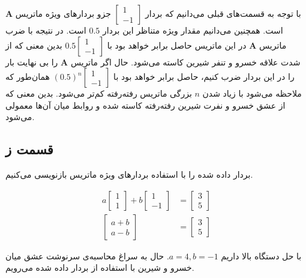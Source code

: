 \documentclass[14pt,a4]{article}
\begin{document}
با توجه به قسمت‌های قبلی می‌دانیم که بردار $\begin{bmatrix}
    1 \\
    -1
\end{bmatrix}$ جزو بردار‌های ویژه ماتریس $\textbf{A}$ است. همچنین می‌دانیم مقدار ویژه متناظر این بردار $0.5$ است.
در نتیجه با ضرب ماتریس $\textbf{A}$ در این ماتریس حاصل برابر خواهد بود با $0.5 \begin{bmatrix}
    1 \\
    -1
\end{bmatrix}$ بدین معنی که از شدت علاقه خسرو و تنفر شیرین کاسته می‌شود.
حال اگر ماتریس $\textbf{A}$
را بی نهایت بار را در این بردار ضرب کنیم، حاصل برابر خواهد بود با $(0.5)^n \begin{bmatrix}
    1 \\
    -1
\end{bmatrix}$ همان‌طور که ملاحظه می‌شود با زیاد شدن $n$ بزرگی ماتریس رفته‌رفته کم‌تر می‌شود. بدین معنی که
از عشق خسرو و نفرت شیرین رفته‌رفته کاسته شده و روابط میان‌ آن‌ها معمولی می‌شود.

\subsection*{قسمت ز}

بردار داده شده را با استفاده بردار‌های ویژه ماتریس بازنویسی می‌کنیم.

\begin{align*}
    a \begin{bmatrix}1 \\ 1\end{bmatrix} + b \begin{bmatrix}1\\ -1\end{bmatrix} & = \begin{bmatrix}3\\ 5\end{bmatrix} \\
    \begin{bmatrix}a + b \\ a - b\end{bmatrix} & = \begin{bmatrix}3\\ 5\end{bmatrix}
\end{align*}

با حل دستگاه بالا داریم $a=4, b=-1$. حال به سراغ محاسبه‌ی سرنوشت عشق میان خسرو و شیرین با استفاده از بردار داده شده
می‌رویم.
\end{document}
